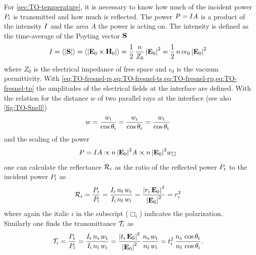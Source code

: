For \cref{sec:TO-temperature}, it is necessary to know how much of the incident 
power $P_{\mathrm{i}}$ is transmitted and how much is reflected. The power 
$P=I A$ is a product of the intensity $I$ and the area $A$ 
the power is acting on. The intensity is defined as the time-average of the 
Poyting vector $\vb{S}$
\begin{equation}
  I = \left\langle \abs{\vb{S}} \right\rangle = 
  \left\langle \abs{\vb{E}_{0}\times\vb{H}_{0}} \right\rangle = 
  \frac{1}{2}\,\frac{n}{Z_{0}}\,\abs{\vb{E}_{0}}^{2} = 
  \frac{1}{2}\,n\,c\epsilon_{0}\,\abs{\vb{E}_{0}}^{2}
\end{equation}
where $Z_{0}$ is the electrical impedance of free space and $\epsilon_{0}$ is 
the vacuum permittivity. With 
\cref{eq:TO-fresnel-rs,eq:TO-fresnel-ts,eq:TO-fresnel-rp,eq:TO-fresnel-tp} the 
amplitudes of the electrical fields at the interface are defined. With the 
relation for the distance $w$ of two parallel rays at the interface (see also 
\cref{fig:TO-Snell})
\begin{equation}
  w = \frac{w_{\mathrm{i}}}{\cos\theta_{\mathrm{i}}} = \frac{w_{\mathrm{r}}}{\cos\theta_{\mathrm{r}}} = 
  \frac{w_{\mathrm{t}}}{\cos\theta_{\mathrm{t}}}
  \label{eq:TO-area}
\end{equation}
and the scaling of the power
\begin{equation}
  P = I A \propto n\,\abs{\vb{E}_{0}}^{2}A \propto
  n\,\abs{\vb{E}_{0}}^{2}w_{\Box}
\end{equation}
one can calculate the reflectance $\mathcal{R}_{i}$ as the ratio of the reflected 
power $P_{\mathrm{r}}$ to the incident power $P_{\mathrm{i}}$ as
\begin{equation}
  \mathcal{R}_{i} = \frac{P_{\mathrm{r}}}{P_{\mathrm{i}}} = 
  \frac{I_{\mathrm{r}}\,n_{\mathrm{f}}\,w_{\mathrm{r}}}{I_{\mathrm{i}}\,n_{\mathrm{f}}\,w_{\mathrm{i}}} 
  =\frac{\abs{r_{i}\,\vb{E}_{0}}^{2}}{\abs{\vb{E}_{0}}^{2}} = 
  r_{i}^{2}
  \label{eq:TO-fresnelR}
\end{equation}
where again the italic $i$ in the subscript ($\Box_{i}$) indicates the 
polarization. Similarly one finds the transmittance $\mathcal{T}_{i}$ as
\begin{equation}
  \mathcal{T}_{i} = \frac{P_{\mathrm{t}}}{P_{\mathrm{i}}} = 
  \frac{I_{\mathrm{t}}\,n_{\mathrm{s}}\,w_{\mathrm{t}}}{I_{\mathrm{i}}\,n_{\mathrm{f}}\,w_{\mathrm{i}}} 
  =\frac{\abs{t_{i}\,\vb{E}_{0}}^{2}}{\abs{\vb{E}_{0}}^{2}}\,\frac{n_{\mathrm{s}}\,w_{\mathrm{t}}}{n_{\mathrm{f}}\,w_{\mathrm{i}}} 
  = t_{i}^{2}\,\frac{n_{\mathrm{s}}\,\cos\theta_{\mathrm{t}}}{n_{\mathrm{f}}\,\cos\theta_{\mathrm{i}}}.
  \label{eq:TO-fresnelT}
\end{equation}
